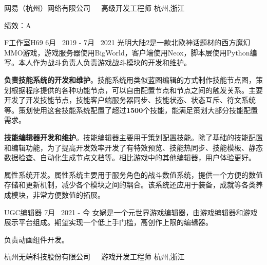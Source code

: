 \begin{cventries}
\cventrycompany
{网易（杭州）网络有限公司~~~高级开发工程师} %
{杭州,浙江} %

\cventrycompany
{绩效：A} %
{~} %

\cventryproject
{F工作室H69} %
{6月~ 2019 - 7月~ 2021} %
{光明大陆2是一款北欧神话题材的西方魔幻MMO游戏，游戏服务器使用BigWorld，客户端使用Neox，脚本层使用Python编写。本人作为战斗负责人负责游戏战斗模块的开发和维护。}
{ %
	\begin{cvitems}
		\item {\textbf{负责技能系统的开发和维护}。技能系统用类似蓝图编辑的方式制作技能节点图，策划根据程序提供的各种功能节点，可以自由配置节点和节点之间的触发关系。主要开发了开发技能节点，技能客户端服务器同步、技能状态、状态互斥、符文系统等。策划使用这套技能系统配置了超过\textbf{1500}个技能，能满足策划大部分技能配置需求。}
		\item{\textbf{技能编辑器开发和维护}。技能编辑器主要用于策划配置技能。除了基础的技能配置和编辑功能，为了提高开发效率开发了有特效预览、技能热同步、技能模板、静态数据检查、自动化生成节点文档等。相比游戏中的其他编辑器，用户体验更好。}
		\item{属性系统开发。属性系统主要用于服务角色的战斗数值系统，提供一个方便的数值存储和更新机制，减少各个模块之间的耦合。该系统还应用于装备，成就等各类养成模块，非常方便数值的拓展。}
	\end{cvitems}
}

\cventryproject
{UGC编辑器} %
{7月~ 2021 - 今} %
{女娲是一个元世界游戏编辑器，由游戏编辑器和游戏展示平台组成。期望实现一个低上手门槛，高创作上限的编辑器。}
{ %
	\begin{cvitems}
		\item {负责动画组件开发。}
	\end{cvitems}
}


\cventrycompany
{杭州无端科技股份有限公司~~~游戏开发工程师} %
{杭州,浙江} %


\end{cventries}
